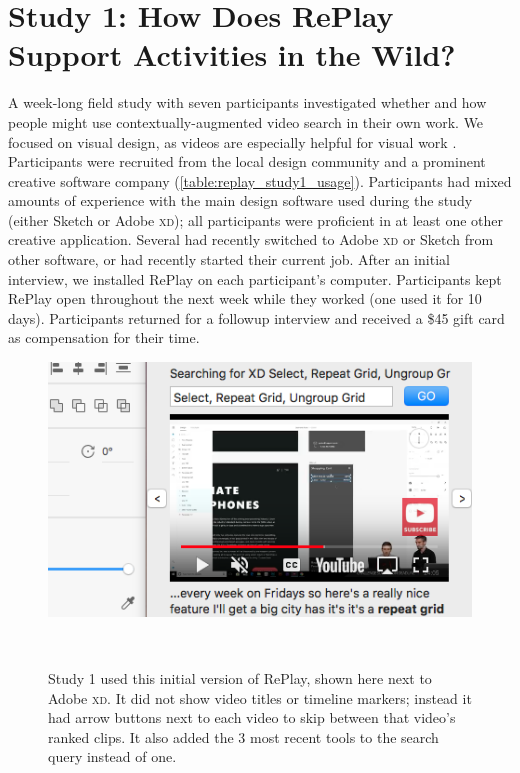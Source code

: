 \section{Study 1: How Does RePlay Support Activities in the Wild?}

A week-long field study with seven participants investigated whether and how people might use contextually-augmented video search in their own work. We focused on visual design, as videos are especially helpful for visual work \cite{Chi2012}.  Participants were recruited from the local design community and a prominent creative software company (\autoref{table:replay_study1_usage}). Participants had mixed amounts of experience with the main design software used during the study (either Sketch or Adobe \textsc{xd}); all participants were proficient in at least one other creative application. Several had recently switched to Adobe \textsc{xd} or Sketch from other software, or had recently started their current job. After an initial interview, we installed RePlay on each participant's computer. Participants kept RePlay open throughout the next week while they worked (one used it for 10 days). Participants returned for a followup interview and received a \$45 gift card as compensation for their time. 

\begin{figure}[b!]
\centering
  \includegraphics[width=.6\textwidth]{replay/figures/replay-old.png}
  \caption{Study 1 used this initial version of RePlay, shown here next to Adobe \textsc{xd}. It did not show video titles or timeline markers; instead it had arrow buttons next to each video to skip between that video's ranked clips. It also added the 3 most recent tools to the search query instead of one. }~\label{fig:replay-old}
\end{figure}

